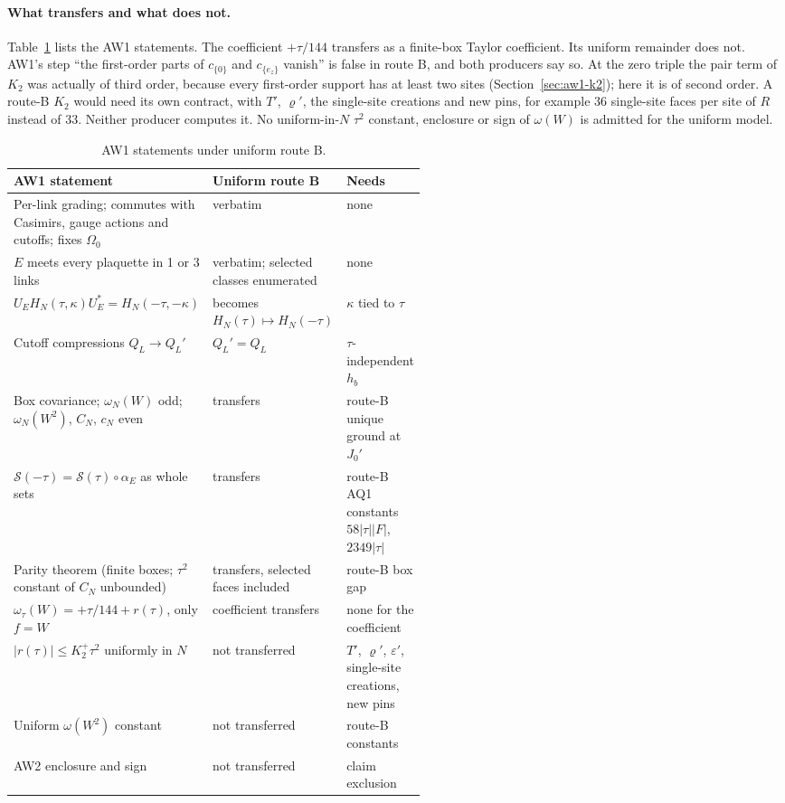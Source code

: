 \paragraph{What transfers and what does not.}
Table~\ref{tab:ax1-quantifiers} lists the AW1 statements. The coefficient
$+\tau/144$ transfers as a finite-box Taylor coefficient. Its uniform
remainder does not. AW1's step ``the first-order parts of $c_{\{0\}}$ and
$c_{\{e_z\}}$ vanish'' is false in route B, and both producers say so. At the
zero triple the pair term of $K_2$ was actually of third order, because every
first-order support has at least two sites (Section~\ref{sec:aw1-k2}); here it
is of second order. A route-B $K_2$ would need its own contract, with $T'$,
$\varrho'$, the single-site creations and new pins, for example 36 single-site
faces per site of $R$ instead of 33. Neither producer computes it. No
uniform-in-$N$ $\tau^2$ constant, enclosure or sign of $\omega(W)$ is
admitted for the uniform model.

\begin{table}[htbp]
\centering\small
\caption{AW1 statements under uniform route B.}
\label{tab:ax1-quantifiers}
\begin{tabularx}{\linewidth}{@{}>{\raggedright\arraybackslash}X
 >{\raggedright\arraybackslash}p{0.25\linewidth}
 >{\raggedright\arraybackslash}p{0.28\linewidth}@{}}
\toprule
AW1 statement & Uniform route B & Needs\\
\midrule
Per-link grading; commutes with Casimirs, gauge actions and cutoffs; fixes
$\Omega_0$ & verbatim & none\\
$E$ meets every plaquette in 1 or 3 links & verbatim; selected classes
enumerated & none\\
$U_EH_N(\tau,\kappa)U_E^*=H_N(-\tau,-\kappa)$ & becomes
$H_N(\tau)\mapsto H_N(-\tau)$ & $\kappa$ tied to $\tau$\\
Cutoff compressions $Q_L\to Q_L'$ & $Q_L'=Q_L$ & $\tau$-independent $h_b$\\
Box covariance; $\omega_N(W)$ odd; $\omega_N(W^2)$, $C_N$, $c_N$ even &
transfers & route-B unique ground at $J_0'$\\
$\mathcal S(-\tau)=\mathcal S(\tau)\circ\alpha_E$ as whole sets & transfers &
route-B AQ1 constants $58|\tau||F|$, $2349|\tau|$\\
Parity theorem (finite boxes; $\tau^2$ constant of $C_N$ unbounded) &
transfers, selected faces included & route-B box gap\\
$\omega_\tau(W)=+\tau/144+r(\tau)$, only $f=W$ & coefficient transfers & none
for the coefficient\\
$|r(\tau)|\le K_2^+\tau^2$ uniformly in $N$ & not transferred & $T'$,
$\varrho'$, $\varepsilon'$, single-site creations, new pins\\
Uniform $\omega(W^2)$ constant & not transferred & route-B constants\\
AW2 enclosure and sign & not transferred & claim exclusion\\
\bottomrule
\end{tabularx}
\end{table}


